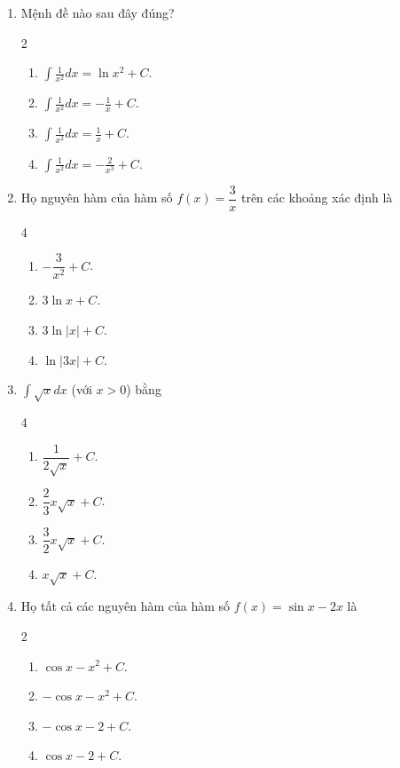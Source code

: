 \documentclass[12pt]{article}
\begin{document}
\begin{enumerate}[label=\textbf{Câu \arabic*.}]
		\item Mệnh đề nào sau đây đúng?
		\begin{multicols}{2}
			\begin{enumerate}[label=\textbf{\Alph*.}]
				\item $\displaystyle \int \frac{1}{x^2} dx = \ln x^2 + C$.
				\item $\displaystyle \int \frac{1}{x^2} dx = -\frac{1}{x} + C$.
				\item $\displaystyle \int \frac{1}{x^2} dx = \frac{1}{x} + C$.
				\item $\displaystyle \int \frac{1}{x^2} dx = -\frac{2}{x^3} + C$.
			\end{enumerate}
		\end{multicols}
		
		\item Họ nguyên hàm của hàm số $f(x) = \dfrac{3}{x}$ trên các khoảng xác định là
		\begin{multicols}{4}
			\begin{enumerate}[label=\textbf{\Alph*.}]
				\item $-\dfrac{3}{x^2} + C$.
				\item $3\ln x + C$.
				\item $3\ln|x| + C$.
				\item $\ln|3x| + C$.
			\end{enumerate}
		\end{multicols}
		
		\item $\displaystyle \int \sqrt{x} dx$ (với $x > 0$) bằng
		\begin{multicols}{4}
			\begin{enumerate}[label=\textbf{\Alph*.}]
				\item $\dfrac{1}{2\sqrt{x}} + C$.
				\item $\dfrac{2}{3}x\sqrt{x} + C$.
				\item $\dfrac{3}{2}x\sqrt{x} + C$.
				\item $x\sqrt{x} + C$.
			\end{enumerate}
		\end{multicols}
		
		\item Họ tất cả các nguyên hàm của hàm số $f(x) = \sin x - 2x$ là
		\begin{multicols}{2}
			\begin{enumerate}[label=\textbf{\Alph*.}]
				\item $\cos x - x^2 + C$.
				\item $-\cos x - x^2 + C$.
				\item $-\cos x - 2 + C$.
				\item $\cos x - 2 + C$.
			\end{enumerate}
		\end{multicols}
		

\end{enumerate}
\end{document}
